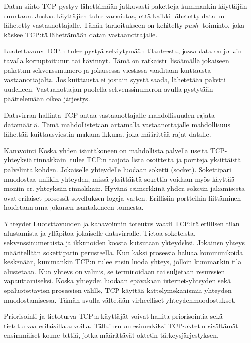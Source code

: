\documentclass[utf8]{gradu3}
\begin{document}
\begin{desclist}
\item[Datan siirto] TCP pystyy lähettämään jatkuvasti paketteja kummankin käyttäjän suuntaan. Joskus käyttäjien tulee varmistaa, että kaikki lähetetty data on lähetetty vastaanottajalle. Tähän tarkoitukseen on kehitelty \emph{push} -toiminto, joka käskee TCP:tä
lähettämään datan vastaanottajalle.
\item[Luotettavuus] TCP:n tulee pystyä selviytymään tilanteesta, jossa data on jollain tavalla korruptoitunut tai hävinnyt. Tämä on ratkaistu lisäämällä jokaiseen pakettiin sekvenssinumero ja jokaisessa viestissä vaaditaan kuittausta vastaanottajalta. Jos kuittausta ei jostain syystä saada, lähetetään paketti uudelleen. Vastaanottajan puolella sekvenssinumeron avulla pystytään päättelemään oikea järjestys.
\item[Datavirran hallinta] TCP antaa vastaanottajalle mahdollisuuden rajata datamääriä. Tämä mahdollistetaan antamalla vastaanottajalle mahdollisuus lähettää kuittausviestin mukana ikkuna, joka määrittää rajat datalle.
\item[Kanavointi] Koska yhden isäntäkoneen on mahdollista palvella useita TCP-yhteyksiä rinnakkain, tulee TCP:n tarjota lista osoitteita ja portteja yksittäistä palvelinta kohden. Jokaiselle yhteydelle luodaan soketti (socket). Sokettipari muodostaa uniikin yhteyden, missä yksittäistä sokettia voidaan myös käyttää moniin eri yhteyksiin rinnakkain. Hyvänä esimerkkinä yhden soketin jakamisesta ovat erilaiset prosessit sovelluksen logeja varten. Erillisiin portteihin liittäminen hoidetaan aina jokaisen isäntäkoneen toimesta.
\item[Yhteydet] Luotettavuuden ja kanavoinnin toteutus vaatii TCP:ltä erillisen tilan alustamista ja ylläpitoa jokaiselle datavirralle. Tietoa soketeista, sekvenssinumeroista ja ikkunoiden koosta kutsutaan yhteydeksi. Jokainen yhteys määritellään sokettiparin perusteella. Kun kaksi prosessia haluaa kommunikoida keskenään, kummankin TCP:n tulee ensin luoda yhteys, jolloin kummankin tila alustetaan. Kun yhteys on valmis, se terminoidaan tai suljetaan resurssien vapauttamiseksi. Koska yhteydet luodaan epävakaan internet-yhteyden sekä epäluotettavien prosessien välille, TCP käyttää kättelymekanismia yhteyden muodostamisessa. Tämän avulla vältetään virheelliset yhteydenmuodostukset.
\item[Priorisointi ja tietoturva] TCP:n käyttäjät voivat hallita priorisointia sekä tietoturvaa erilaisilla arvoilla. Tällainen on esimerkiksi TCP-oktetin sisältämät ensimmäiset kolme bittiä, jotka määrittävät oktetin tärkeysjärjestyksen.
\end{desclist}
\end{document}
